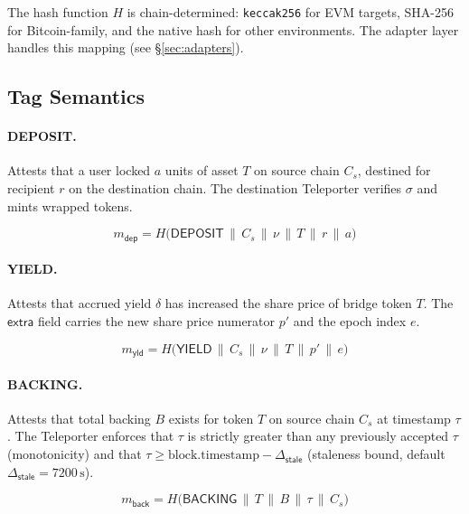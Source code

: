 The hash function $H$ is chain-determined: \texttt{keccak256} for EVM targets, SHA-256 for Bitcoin-family, and the native hash for other environments. The adapter layer handles this mapping (see \S\ref{sec:adapters}).

\subsection{Tag Semantics}

\paragraph{DEPOSIT.} Attests that a user locked $a$ units of asset $T$ on source chain $C_s$, destined for recipient $r$ on the destination chain. The destination Teleporter verifies $\sigma$ and mints wrapped tokens.

\begin{equation}
  m_{\mathsf{dep}} = H\bigl(\mathsf{DEPOSIT} \,\|\, C_s \,\|\, \nu \,\|\, T \,\|\, r \,\|\, a\bigr)
  \label{eq:deposit}
\end{equation}

\paragraph{YIELD.} Attests that accrued yield $\delta$ has increased the share price of bridge token $T$. The $\mathsf{extra}$ field carries the new share price numerator $p'$ and the epoch index $e$.

\begin{equation}
  m_{\mathsf{yld}} = H\bigl(\mathsf{YIELD} \,\|\, C_s \,\|\, \nu \,\|\, T \,\|\, p' \,\|\, e\bigr)
  \label{eq:yield}
\end{equation}

\paragraph{BACKING.} Attests that total backing $B$ exists for token $T$ on source chain $C_s$ at timestamp $\tau$. The Teleporter enforces that $\tau$ is strictly greater than any previously accepted $\tau$ (monotonicity) and that $\tau \geq \mathrm{block.timestamp} - \Delta_{\mathsf{stale}}$ (staleness bound, default $\Delta_{\mathsf{stale}} = 7200\,\text{s}$).

\begin{equation}
  m_{\mathsf{back}} = H\bigl(\mathsf{BACKING} \,\|\, T \,\|\, B \,\|\, \tau \,\|\, C_s\bigr)
  \label{eq:backing}
\end{equation}

